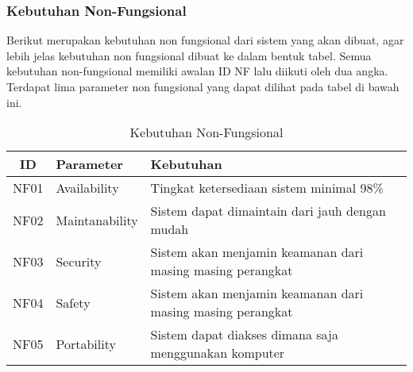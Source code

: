 \subsubsection{Kebutuhan Non-Fungsional}
Berikut merupakan kebutuhan non fungsional dari sistem yang akan dibuat, agar lebih jelas kebutuhan non fungsional dibuat ke dalam bentuk tabel. Semua kebutuhan non-fungsional memiliki awalan ID NF lalu diikuti oleh dua angka. Terdapat lima parameter non fungsional yang dapat dilihat pada tabel di bawah ini.
\begin{table}[ht]
  \caption{Kebutuhan Non-Fungsional}
  \label{tab:kebutuhan-non-fungsional}
  \centering
  \begin{tabular}{|c|p{3cm}|p{8cm}|}
    \hline
    ID   & Parameter      & Kebutuhan                                                  \\
    \hline
    NF01 & Availability   & Tingkat ketersediaan sistem minimal 98\%                   \\
    \hline
    NF02 & Maintanability & Sistem dapat dimaintain dari jauh dengan mudah             \\
    \hline
    NF03 & Security       & Sistem akan menjamin keamanan dari masing masing perangkat \\
    \hline
    NF04 & Safety         & Sistem akan menjamin keamanan dari masing masing perangkat \\
    \hline
    NF05 & Portability    & Sistem dapat diakses dimana saja menggunakan komputer      \\
    \hline
  \end{tabular}
\end{table}